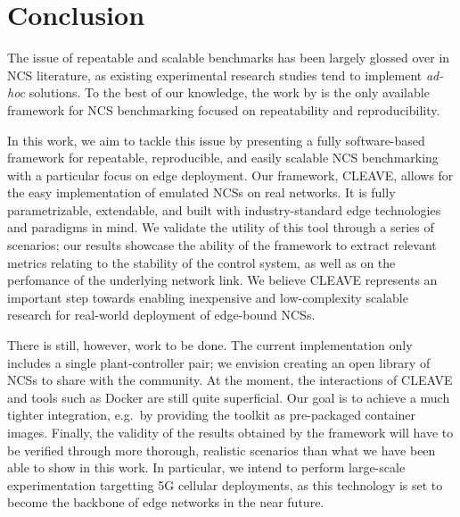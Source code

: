 \section{Conclusion}\label{sec:conclusion}

The issue of repeatable and scalable benchmarks has been largely glossed over in \ac{NCS} literature, as existing experimental research studies tend to implement \emph{ad-hoc} solutions.
To the best of our knowledge, the work by \textcite{Zoppi2020NCSBench} is the only available framework for \ac{NCS} benchmarking focused on repeatability and reproducibility.

In this work, we aim to tackle this issue by presenting a fully software-based framework for repeatable, reproducible, and easily scalable \ac{NCS} benchmarking with a particular focus on edge deployment.
Our framework, \ac{CLEAVE}, allows for the easy implementation of emulated \acp{NCS} on real networks.
It is fully parametrizable, extendable, and built with industry-standard edge technologies and paradigms in mind.
We validate the utility of this tool through a series of scenarios; our results showcase the ability of the framework to extract relevant metrics relating to the stability of the control system, as well as on the perfomance of the underlying network link.
We believe \ac{CLEAVE} represents an important step towards enabling inexpensive and low-complexity scalable research for real-world deployment of edge-bound \acp{NCS}.

There is still, however, work to be done.
The current implementation only includes a single plant-controller pair; we envision creating an open library of \acp{NCS} to share with the community.
At the moment, the interactions of \ac{CLEAVE} and tools such as Docker are still quite superficial.
Our goal is to achieve a much tighter integration, e.g.\ by providing the toolkit as pre-packaged container images.
Finally, the validity of the results obtained by the framework will have to be verified through more thorough, realistic scenarios than what we have been able to show in this work.
In particular, we intend to perform large-scale experimentation targetting 5G cellular deployments, as this technology is set to become the backbone of edge networks in the near future.
